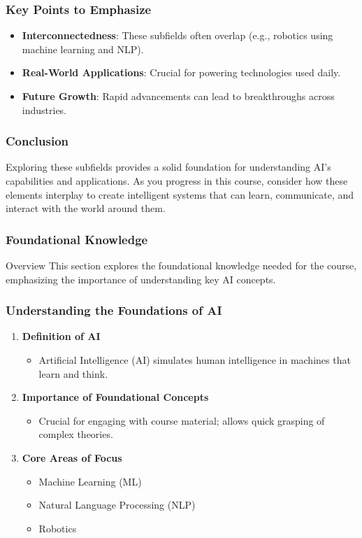 \documentclass[aspectratio=169]{beamer}
\begin{document}
\begin{frame}[fragile]
    \frametitle{Key Points to Emphasize}
    \begin{itemize}
        \item \textbf{Interconnectedness}: These subfields often overlap (e.g., robotics using machine learning and NLP).
        \item \textbf{Real-World Applications}: Crucial for powering technologies used daily.
        \item \textbf{Future Growth}: Rapid advancements can lead to breakthroughs across industries.
    \end{itemize}
\end{frame}

\begin{frame}[fragile]
    \frametitle{Conclusion}
    Exploring these subfields provides a solid foundation for understanding AI’s capabilities and applications. 
    As you progress in this course, consider how these elements interplay to create intelligent systems that can learn, communicate, and interact with the world around them.
\end{frame}

\begin{frame}[fragile]
    \frametitle{Foundational Knowledge}
    \begin{block}{Overview}
        This section explores the foundational knowledge needed for the course, emphasizing the importance of understanding key AI concepts.
    \end{block}
\end{frame}

\begin{frame}[fragile]
    \frametitle{Understanding the Foundations of AI}
    
    \begin{enumerate}
        \item \textbf{Definition of AI}
        \begin{itemize}
            \item Artificial Intelligence (AI) simulates human intelligence in machines that learn and think.
        \end{itemize}

        \item \textbf{Importance of Foundational Concepts}
        \begin{itemize}
            \item Crucial for engaging with course material; allows quick grasping of complex theories.
        \end{itemize}

        \item \textbf{Core Areas of Focus}
        \begin{itemize}
            \item Machine Learning (ML)
            \item Natural Language Processing (NLP)
            \item Robotics
        \end{itemize}
    \end{enumerate}
\end{frame}
\end{document}

